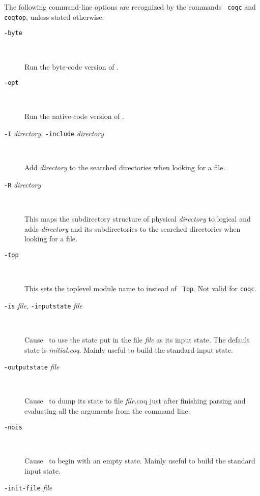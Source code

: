 The following command-line options are recognized by the commands {\tt
  coqc} and {\tt coqtop}, unless stated otherwise:

\begin{description}
\item[{\tt -byte}]\ 

  Run the byte-code version of \Coq{}.

\item[{\tt -opt}]\ 

  Run the native-code version of \Coq{}.

\item[{\tt -I} {\em directory}, {\tt -include} {\em directory}]\ 

  Add {\em directory} to the searched directories when looking for a
  file.

\item[{\tt -R} {\em directory} {\dirpath}]\ 

  This maps the subdirectory structure of physical {\em directory} to
  logical {\dirpath} and adds {\em directory} and its subdirectories
  to the searched directories when looking for a file.

\item[{\tt -top} {\dirpath}]\ 

  This sets the toplevel module name to {\dirpath} instead of {\tt
  Top}. Not valid for {\tt coqc}.

\item[{\tt -is} {\em file}, {\tt -inputstate} {\em file}]\ 

  Cause \Coq~to use the state put in the file {\em file} as its input
  state. The default state is {\em initial.coq}.
  Mainly useful to build the standard input state.

\item[{\tt -outputstate} {\em file}]\ 

  Cause \Coq~to dump its state to file {\em file}.coq just after finishing
  parsing and evaluating all the arguments from the command line.

\item[{\tt -nois}]\ 

  Cause \Coq~to begin with an empty state. Mainly useful to build the
  standard input state.

%
%

\item[{\tt -init-file} {\em file}]\ 


\end{description}
